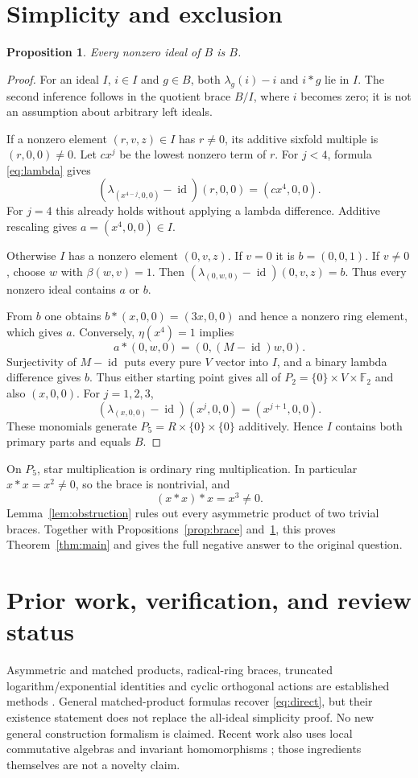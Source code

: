\documentclass[11pt]{article}
\newtheorem{proposition}[theorem]{Proposition}
\newcommand{\F}{\mathbb F}
\newcommand{\id}{\operatorname{id}}
\begin{document}
\section{Simplicity and exclusion}
\begin{proposition}\label{prop:simple}
Every nonzero ideal of $B$ is $B$.
\end{proposition}
\begin{proof}
For an ideal $I$, $i\in I$ and $g\in B$, both
$\lambda_g(i)-i$ and $i*g$ lie in $I$. The second inference follows
in the quotient brace $B/I$, where $i$ becomes zero; it is not an
assumption about arbitrary left ideals.

If a nonzero element $(r,v,z)\in I$ has $r\ne0$, its additive
sixfold multiple is $(r,0,0)\ne0$. Let $c x^j$ be the lowest nonzero
term of $r$. For $j<4$, formula \eqref{eq:lambda} gives
\[
 (\lambda_{(x^{4-j},0,0)}-\id)(r,0,0)=(c x^4,0,0).
\]
For $j=4$ this already holds without applying a lambda difference.
Additive rescaling gives $a=(x^4,0,0)\in I$.

Otherwise $I$ has a nonzero element $(0,v,z)$. If $v=0$ it is
$b=(0,0,1)$. If $v\ne0$, choose $w$ with $\beta(w,v)=1$.
Then $(\lambda_{(0,w,0)}-\id)(0,v,z)=b$.
Thus every nonzero ideal contains $a$ or $b$.

From $b$ one obtains
$b*(x,0,0)=(3x,0,0)$ and hence a nonzero ring element, which gives $a$.
Conversely, $\eta(x^4)=1$ implies
\[
 a*(0,w,0)=(0,(M-\id)w,0).
\]
Surjectivity of $M-\id$ puts every pure $V$ vector into $I$, and a
binary lambda difference gives $b$. Thus either starting point gives
all of $P_2=\{0\}\times V\times\F_2$ and also $(x,0,0)$.
For $j=1,2,3$,
\[
 (\lambda_{(x,0,0)}-\id)(x^j,0,0)=(x^{j+1},0,0).
\]
These monomials generate $P_5=R\times\{0\}\times\{0\}$ additively.
Hence $I$ contains both primary parts and equals $B$.
\end{proof}

On $P_5$, star multiplication is ordinary ring multiplication.
In particular $x*x=x^2\ne0$, so the brace is nontrivial, and
\[
                        (x*x)*x=x^3\ne0.
\]
Lemma~\ref{lem:obstruction} rules out every asymmetric product of two
trivial braces. Together with Propositions~\ref{prop:brace}
and~\ref{prop:simple}, this proves Theorem~\ref{thm:main} and gives the
full negative answer to the original question.

\section{Prior work, verification, and review status}
Asymmetric and matched products, radical-ring braces, truncated
logarithm/exponential identities and cyclic orthogonal actions are
established methods \cite{CCS,BCJO,CJOabundance,CJOembed}.
General matched-product formulas \cite{Bachiller} recover \eqref{eq:direct}, but their
existence statement does not replace the all-ideal simplicity proof.
No new general construction formalism is claimed. Recent work also
uses local commutative algebras and invariant homomorphisms
\cite{Verbeken}; those ingredients themselves are not a novelty claim.
\end{document}
